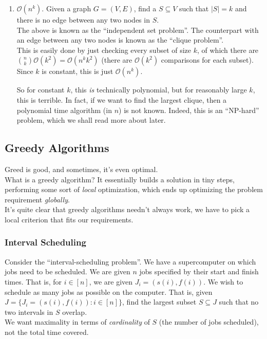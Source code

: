 \begin{enumerate}
	\item $\mathcal{O}(n^k)$. Given a graph $G=(V,E)$, find a $S\subseteq V$ such that $|S|=k$ and there is no edge between any two nodes in $S$.\\
	The above is known as the ``independent set problem''. The counterpart with an edge between any two nodes is known as the ``clique problem''.\\
	This is easily done by just checking every subset of size $k$, of which there are $\binom{n}{k}\mathcal{O}(k^2)=\mathcal{O}(n^k k^2)$ (there are $\mathcal{O}(k^2)$ comparisons for each subset). Since $k$ is constant, this is just $\mathcal{O}(n^k)$.

	So for constant $k$, this \textit{is} technically polynomial, but for reasonably large $k$, this is terrible. In fact, if we want to find the largest clique, then a polynomial time algorithm (in $n$) is not known. Indeed, this is an ``NP-hard'' problem, which we shall read more about later.

\end{enumerate}


\subsection{Greedy Algorithms}

Greed is good, and sometimes, it's even optimal.\\

What is a greedy algorithm? It essentially builds a solution in tiny steps, performing some sort of \textit{local} optimization, which ends up optimizing the problem requirement \textit{globally}.\\
It's quite clear that greedy algorithms needn't always work, we have to pick a local criterion that fits our requirements.\\

\subsubsection{Interval Scheduling}

Consider the ``interval-scheduling problem''. We have a supercomputer on which jobs need to be scheduled. We are given $n$ jobs specified by their start and finish times. That is, for $i\in[n]$, we are given $J_i = (s(i),f(i))$. We wish to schedule as many jobs as possible on the computer. That is, given $J = \{J_i = (s(i),f(i)) : i\in[n]\}$, find the largest subset $S\subseteq J$ such that no two intervals in $S$ overlap.\\
We want maximality in terms of \textit{cardinality} of $S$ (the number of jobs scheduled), not the total time covered.

